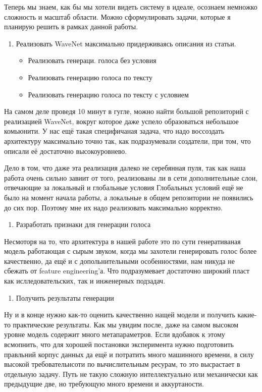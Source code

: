 \documentclass[../diploma.tex]{subfiles}
\begin{document}
Теперь мы знаем, как бы мы хотели видеть систему в идеале, осознаем немножко сложность и масштаб области.
Можно сформулировать задачи, которые я планирую решить в рамках данной работы. 

\begin{enumerate}
    \item Реализовать WaveNet максимально придерживаясь описания из статьи.
    \begin{itemize}
        \item Реализовать генераци. голоса без условия
        \item Реализовать генерацию голоса по тексту
        \item Реализовать генерацию голоса по тексту с условием
    \end{itemize}    
\end{enumerate}

На самом деле проведя 10 минут в гугле, можно найти большой репозиторий с реализацией WaveNet, вокруг которое даже успело образоваться небольшое комьюнити. У нас ещё такая специфичаная задача, что надо воссоздать архитектуру максимально точно так, как подразумевали создатели, при том, что описали её достаточно высокоуровнево.

Дело в том, что даже эта реализация далеко не серебянная пуля, так как наша работа очень сильно завиит от того, реализованы ли в сети дополнительные слои, отвечающие за локальный и глобальные условия
Глобальных условий ещё не было на момент начала работы, а локальные в общем репозитории не появились до сих пор. Поэтому мне их надо реализовать максимально корректно.

\begin{enumerate}[resume]
    \item Разработать признаки для генерации голоса
\end{enumerate}

Несмоторя на то, что архитектура в нашей работе это по сути генеративаная модель работающая с сырым звуком, когда мы захотели генерировать голос более качественно, да ещё и с допольнительными особенностями, нам никуда не сбежать от feature engineering'а. Что подразумевает достаточно широкий пласт как ислледовательских, так и инженерных подзадач.

\begin{enumerate}[resume]
    \item Получить результаты генерации
\end{enumerate}

Ну и в конце нужно как-то оценить качественно нащей модели и получить какие-то практические результаты. Как мы увидим после, даже на самом высоком уровне модель содержит много метапараметров.
Если вдобавок к этому всмопнить, что для хорошей постановки эксперимента нужно подготовить правльний корпус данных да ещё и потратить много машинного времени, в силу высокой требовательнсоти по вычислительным ресурам, то это высрастает в отдельную задачу. 
Путь не такую сложную интеллектуально или механически как предыдущие две, но требующую много времени и аккуртаности.
\end{document}
